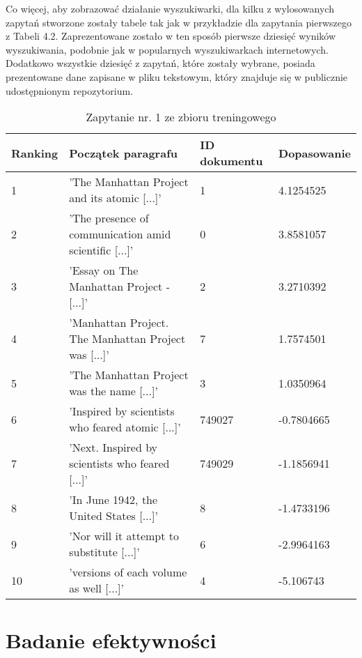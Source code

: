 Co więcej, aby zobrazować działanie wyszukiwarki, dla kilku z wylosowanych zapytań stworzone zostały tabele tak jak w przykładzie dla zapytania pierwszego z Tabeli 4.2. Zaprezentowane zostało w ten sposób pierwsze dziesięć wyników wyszukiwania, podobnie jak w popularnych wyszukiwarkach internetowych. Dodatkowo wszystkie dziesięć z zapytań, które zostały wybrane, posiada prezentowane dane zapisane w pliku tekstowym, który znajduje się w publicznie udostępnionym repozytorium. 

\begin{table}[htp]
\centering
\caption{Zapytanie nr. 1 ze zbioru treningowego}
\vspace*{5mm}
\begin{tabular}{llll}
   Ranking & Początek paragrafu & ID dokumentu & Dopasowanie \\
   \hline
    1 & 'The Manhattan Project and its atomic [...]' & 1 & 4.1254525 \\
    2 & 'The presence of communication amid scientific [...]' & 0 &  3.8581057\\
    3 & 'Essay on The Manhattan Project - [...]' & 2 & 3.2710392 \\
    4 & 'Manhattan Project. The Manhattan Project was [...]' & 7 & 1.7574501 \\
    5 & 'The Manhattan Project was the name [...]' & 3 & 1.0350964 \\
    6 & 'Inspired by scientists who feared atomic [...]' & 749027 &  -0.7804665 \\
    7 & 'Next. Inspired by scientists who feared  [...]' & 749029 & -1.1856941 \\
    8 & 'In June 1942, the United States [...]' & 8 & -1.4733196 \\
    9 & 'Nor will it attempt to substitute [...]' & 6 & -2.9964163 \\
    10 & 'versions of each volume as well [...]' & 4 & -5.106743 \\

\end{tabular}
\end{table}


\section{Badanie efektywności}


